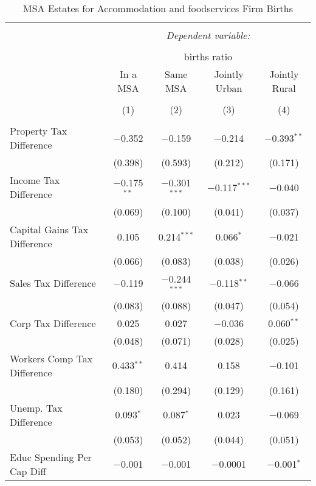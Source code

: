 
\begin{table}[!htbp] \centering 
  \caption{MSA Estates for  Accommodation and foodservices Firm Births} 
  \label{} 
\begin{tabular}{@{\extracolsep{5pt}}lcccc} 
\\[-1.8ex]\hline 
\hline \\[-1.8ex] 
 & \multicolumn{4}{c}{\textit{Dependent variable:}} \\ 
\cline{2-5} 
\\[-1.8ex] & \multicolumn{4}{c}{births ratio} \\ 
 & In a MSA & Same MSA & Jointly Urban & Jointly Rural \\ 
\\[-1.8ex] & (1) & (2) & (3) & (4)\\ 
\hline \\[-1.8ex] 
 Property Tax Difference & $-$0.352 & $-$0.159 & $-$0.214 & $-$0.393$^{**}$ \\ 
  & (0.398) & (0.593) & (0.212) & (0.171) \\ 
  Income Tax Difference & $-$0.175$^{**}$ & $-$0.301$^{***}$ & $-$0.117$^{***}$ & $-$0.040 \\ 
  & (0.069) & (0.100) & (0.041) & (0.037) \\ 
  Capital Gains Tax Difference & 0.105 & 0.214$^{***}$ & 0.066$^{*}$ & $-$0.021 \\ 
  & (0.066) & (0.083) & (0.038) & (0.026) \\ 
  Sales Tax Difference & $-$0.119 & $-$0.244$^{***}$ & $-$0.118$^{**}$ & $-$0.066 \\ 
  & (0.083) & (0.088) & (0.047) & (0.054) \\ 
  Corp Tax Difference & 0.025 & 0.027 & $-$0.036 & 0.060$^{**}$ \\ 
  & (0.048) & (0.071) & (0.028) & (0.025) \\ 
  Workers Comp Tax Difference & 0.433$^{**}$ & 0.414 & 0.158 & $-$0.101 \\ 
  & (0.180) & (0.294) & (0.129) & (0.161) \\ 
  Unemp. Tax Difference & 0.093$^{*}$ & 0.087$^{*}$ & 0.023 & $-$0.069 \\ 
  & (0.053) & (0.052) & (0.044) & (0.051) \\ 
  Educ Spending Per Cap Diff & $-$0.001 & $-$0.001 & $-$0.0001 & $-$0.001$^{*}$ \\ 

\end{tabular}
\end{table}
